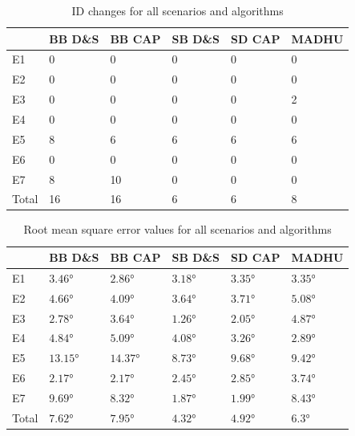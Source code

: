 \begin{appendix}
\begin{table}[!ht]
\centering
\begin{tabular}{l|ll|ll|l}
\toprule
      & BB D\&S & BB CAP & SB D\&S & SD CAP & MADHU \\ \midrule
E1    & 0       & 0      & 0       & 0      & 0     \\
E2    & 0       & 0      & 0       & 0      & 0     \\
E3    & 0       & 0      & 0       & 0      & 2     \\
E4    & 0       & 0      & 0       & 0      & 0     \\
E5    & 8       & 6      & 6       & 6      & 6     \\
E6    & 0       & 0      & 0       & 0      & 0     \\
E7    & 8       & 10     & 0       & 0      & 0     \\ \midrule
Total & 16      & 16     & 6       & 6      & 8    \\
\bottomrule
\end{tabular}
\caption{ID changes for all scenarios and algorithms}
\label{tab:idc}
\end{table}

\begin{table}[!ht]
\centering
\begin{tabular}{l|ll|ll|l}
\toprule
      & BB D\&S & BB CAP & SB D\&S & SD CAP & MADHU \\\midrule
E1    & $\ang{3.46 }$   & $\ang{2.86 }$  & $\ang{3.18 }$   & $\ang{3.35 }$  & $\ang{3.35 }$ \\
E2    & $\ang{4.66 }$   & $\ang{4.09 }$  & $\ang{3.64 }$   & $\ang{3.71 }$  & $\ang{5.08 }$ \\
E3    & $\ang{2.78 }$   & $\ang{3.64 }$  & $\ang{1.26 }$   & $\ang{2.05 }$  & $\ang{4.87 }$ \\
E4    & $\ang{4.84 }$   & $\ang{5.09 }$  & $\ang{4.08 }$   & $\ang{3.26 }$  & $\ang{2.89 }$ \\
E5    & $\ang{13.15}$   & $\ang{14.37}$  & $\ang{8.73 }$   & $\ang{9.68 }$  & $\ang{9.42 }$ \\
E6    & $\ang{2.17 }$   & $\ang{2.17 }$  & $\ang{2.45 }$   & $\ang{2.85 }$  & $\ang{3.74 }$ \\
E7    & $\ang{9.69 }$   & $\ang{8.32 }$  & $\ang{1.87 }$   & $\ang{1.99 }$  & $\ang{8.43 }$ \\ \midrule
Total & $\ang{7.62 }$   & $\ang{7.95 }$  & $\ang{4.32 }$   & $\ang{4.92 }$  & $\ang{6.3  }$\\ \bottomrule
\end{tabular}
\caption{Root mean square error values for all scenarios and algorithms}
\label{tab:rmse}
\end{table}


\end{appendix}
